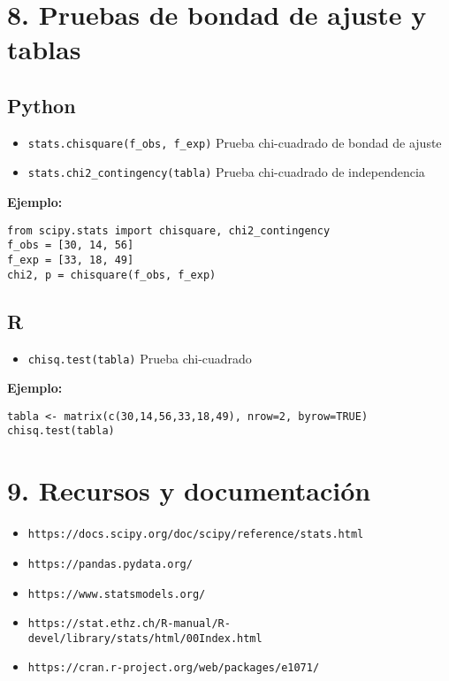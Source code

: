 \section*{8. Pruebas de bondad de ajuste y tablas}

\subsection*{Python}
\begin{itemize}
    \item \texttt{stats.chisquare(f\_obs, f\_exp)} \hfill Prueba chi-cuadrado de bondad de ajuste
    \item \texttt{stats.chi2\_contingency(tabla)} \hfill Prueba chi-cuadrado de independencia
\end{itemize}

\textbf{Ejemplo:}
\begin{verbatim}
from scipy.stats import chisquare, chi2_contingency
f_obs = [30, 14, 56]
f_exp = [33, 18, 49]
chi2, p = chisquare(f_obs, f_exp)
\end{verbatim}

\subsection*{R}
\begin{itemize}
    \item \texttt{chisq.test(tabla)} \hfill Prueba chi-cuadrado
\end{itemize}

\textbf{Ejemplo:}
\begin{verbatim}
tabla <- matrix(c(30,14,56,33,18,49), nrow=2, byrow=TRUE)
chisq.test(tabla)
\end{verbatim}

\section*{9. Recursos y documentación}

\begin{itemize}
    \item \texttt{https://docs.scipy.org/doc/scipy/reference/stats.html}
    \item \texttt{https://pandas.pydata.org/}
    \item \texttt{https://www.statsmodels.org/}
    \item \texttt{https://stat.ethz.ch/R-manual/R-devel/library/stats/html/00Index.html}
    \item \texttt{https://cran.r-project.org/web/packages/e1071/}
\end{itemize}
